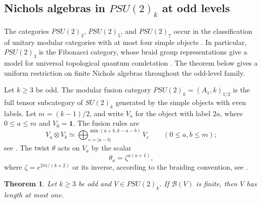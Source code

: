\documentclass[11pt, a4paper]{article}
\numberwithin{equation}{section}
\newcommand{\B}{\mathcal B}
\newcommand{\one}{\mathbf 1}
\newtheorem{theorem}{Theorem}[section]
\begin{document}
\begingroup
\subsection{Nichols algebras in \texorpdfstring{$PSU(2)_k$}{PSU(2)k} at odd levels}
The categories $PSU(2)_3$, $PSU(2)_5$, and $PSU(2)_7$
occur in the classification of unitary modular categories
with at most four simple objects
\cite[Sections~5.3--5.4]{RSW09}.
In particular, $PSU(2)_3$ is the Fibonacci category,
whose braid group representations give a model for universal
topological quantum comletation
\cite[Theorem~6.7]{RSW09}.
The theorem below gives a uniform restriction on finite
Nichols algebras throughout the odd-level family.

Let $k\ge3$ be odd. The modular fusion category $PSU(2)_k=(A_1,k)_{1/2}$
is the full tensor subcategory of $SU(2)_k$ generated by the simple
objects with even labels.  Let $m=(k-1)/2$, and write $V_a$ for the object
with label $2a$, where $0\le a\le m$ and $V_0=\one$.
The fusion rules are
\begin{equation}\label{app:psu-fusion}
 V_a\otimes V_b\simeq
 \bigoplus_{c=|a-b|}^{\min(a+b,k-a-b)}V_c
 \qquad(0\le a,b\le m);
\end{equation}
see \cite[(1.1)]{RS11}.
The twist $\theta$ acts on $V_a$ by the scalar
\begin{equation}\label{app:psu-twists}
 \theta_a=\zeta^{a(a+1)},
\end{equation}
where $\zeta=e^{2\pi i/(k+2)}$ or its inverse, according to the
braiding convention, see  {\cite[Example~5.1, (5.5)]{GMR24}}.

\begin{theorem}\label{app:psu}
Let $k\ge3$ be odd and $V\in PSU(2)_k$.
If $\B(V)$ is finite, then $V$ has length at most one.
\end{theorem}
\end{document}

